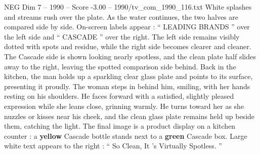 \begin{textsample}{NEG Dim 7 – 1990 – Score -3.00 – 1990/tv\_com\_1990\_116.txt}
White splashes and streams rush over the plate.
As the water continues, the two halves are compared side by side.
On-screen labels appear : “ LEADING BRANDS ” over the left side and “ CASCADE ” over the right.
The left side remains visibly dotted with spots and residue, while the right side becomes clearer and cleaner.
The Cascade side is shown looking nearly spotless, and the clean plate half slides away to the right, leaving the spotted comparison side behind.
Back in the kitchen, the man holds up a sparkling clear glass plate and points to its surface, presenting it proudly.
The woman steps in behind him, smiling, with her hands resting on his shoulders.
He faces forward with a satisfied, slightly pleased expression while she leans close, grinning warmly.
He turns toward her as she nuzzles or kisses near his cheek, and the clean glass plate remains held up beside them, catching the light.
The final image is a product display on a kitchen counter : a \textbf{yellow} Cascade bottle stands next to a \textbf{green} Cascade box.
Large white text appears to the right : “ So Clean, It ’s Virtually Spotless. ”

\end{textsample}
